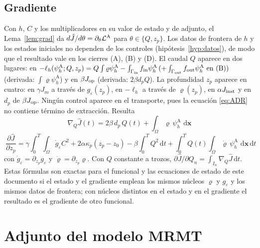 \documentclass[11pt]{article}
\numberwithin{equation}{section}
\theoremstyle{plain}
\theoremstyle{definition}
\theoremstyle{remark}
\newcommand{\bx}{\mathbf{x}}
\newcommand{\Ceps}{g_\varepsilon}              %
\newcommand{\Nuc}{\varrho}                      %
\newcommand{\phA}{\psi_h^{\mathrm A}}       %
\newcommand{\dd}{\,\mathrm d}
\begin{document}
\subsection{Gradiente}
Con $h$, $C$ y los multiplicadores en su valor de estado y de adjunto, el Lema~\ref{lem:grad} da
$d\hat J/d\theta=\partial_\theta\mathcal{L}^{\rm A}$ para $\theta\in\{Q,z_p\}$. Los datos de frontera de $h$ y los estados iniciales no dependen de los controles (hipótesis~\ref{hyp:datos}), de modo que el resultado vale en los cierres (A), (B) y (D).
El caudal $Q$ aparece en dos lugares:
en $-\ell_h(\phA;Q,z_p)=Q\int\Nuc\phA-\int_{\Gamma_{\rm in}}f_{\rm in}\phA\,(+\int_{\Gamma_{\rm out}}f_{\rm out}\phA\text{ en (B)})$ (derivada: $\int\Nuc\phA$) y en
$\beta J_{\rm op}$ (derivada: $2\beta d_pQ$). La profundidad $z_p$ aparece en cuatro: en $\gamma J_m$ a través de $\Ceps(z_p)$, en $-\ell_h$ a través de $\Nuc(z_p)$, en $\alpha J_{\rm inst}$ y en $d_p$ de $\beta J_{\rm op}$.
Ningún control aparece en el transporte, pues la ecuación \eqref{eq:ADR} no contiene término de extracción. Resulta
\begin{equation}
\boxed{\ \nabla_Q\hat J(t)=2\beta\,d_p\,Q(t)+\int_\Omega\Nuc\,\phA\,\dd\bx\ }
\label{eq:grad_Q}
\end{equation}
\begin{equation}
\boxed{\ \frac{\partial\hat J}{\partial z_p}=\gamma\!\int_0^T\!\!\!\int_\Omega\dot g_\varepsilon C^2
+2\alpha\kappa_p(z_p-z_0)-\beta\!\int_0^TQ^2\dd t
+\int_0^T\!\!Q(t)\!\int_\Omega\dot\Nuc\,\phA\,\dd\bx\dd t\ }
\label{eq:grad_z}
\end{equation}
con $\dot g_\varepsilon=\partial_{z_p}\Ceps$ y $\dot\Nuc=\partial_{z_p}\Nuc$. Con $Q$ constante a trozos, $\partial\hat J/\partial Q_n=\int_{I_n}\nabla_Q\hat J\dd t$. Estas fórmulas son exactas para el funcional y las ecuaciones de estado
de este documento si el estado y el gradiente emplean los mismos núcleos $\Nuc$ y $\Ceps$ y los mismos datos de frontera; con núcleos distintos en el estado y en el gradiente el resultado es el gradiente de otro funcional.

\section{Adjunto del modelo MRMT}
\label{sec:adj_MRMT}
\end{document}
